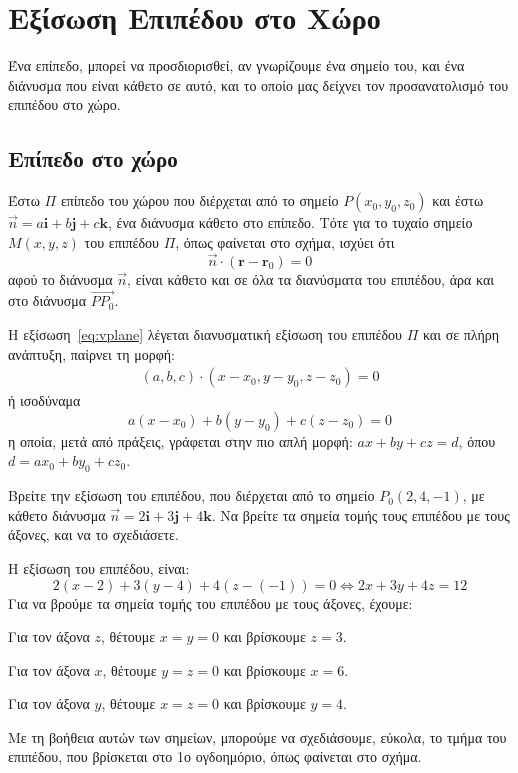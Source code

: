 \chapter*{Εξίσωση Επιπέδου στο Χώρο}

Ένα επίπεδο, μπορεί να προσδιορισθεί, αν γνωρίζουμε ένα σημείο του, και ένα 
διάνυσμα που είναι κάθετο σε αυτό, και το οποίο μας δείχνει τον προσανατολισμό του 
επιπέδου στο χώρο.

\section*{Επίπεδο στο χώρο}

Έστω $ \Pi $ επίπεδο του χώρου που διέρχεται από το σημείο $ P(x_{0}, y_{0}, z_{0}) $ 
και έστω $ \vec{n} = a \mathbf{i} + b \mathbf{j} + c \mathbf{k} $, ένα διάνυσμα κάθετο 
στο επίπεδο. Τότε για το τυχαίο σημείο $ M(x,y,z) $ του επιπέδου $ \Pi $, όπως φαίνεται 
στο σχήμα, ισχύει ότι 
\begin{equation}\label{eq:vplane}
  \vec{n} \cdot (\mathbf{r} - \mathbf{r}_{0}) = 0
\end{equation} 
 αφού το διάνυσμα $ \vec{n} $, είναι κάθετο και σε όλα τα διανύσματα του επιπέδου, άρα 
 και στο διάνυσμα $ \vec{PP_{0}} $. 

 Η εξίσωση~\eqref{eq:vplane} λέγεται \textcolor{Col1}{διανυσματική} εξίσωση του 
 επιπέδου $ \Pi $ και σε πλήρη ανάπτυξη, παίρνει τη μορφή:
 \begin{align*}
   (a,b,c) \cdot (x- x_{0}, y- y_{0}, z- z_{0}) = 0 
 \end{align*} 
 ή ισοδύναμα
 \begin{equation}
   \boxed{a(x- x_{0}) + b(y- y_{0}) + c(z- z_{0}) = 0}
 \end{equation}
 η οποία, μετά από πράξεις, γράφεται στην πιο απλή μορφή:
 $ ax+by+cz=d $, όπου $ d=a x_{0}+ b y_{0}+cz_{0} $.

 \begin{example}
   Βρείτε την εξίσωση του επιπέδου, που διέρχεται από το σημείο $ P_{0}(2,4,-1) $, με 
   κάθετο διάνυσμα $ \vec{n} = 2 \mathbf{i} + 3 \mathbf{j} + 4 \mathbf{k} $. Να βρείτε 
   τα σημεία τομής τους επιπέδου με τους άξονες, και να το σχεδιάσετε.
 \end{example}
 \begin{solution}
   Η εξίσωση του επιπέδου, είναι:
   \[
     2(x-2)+3(y-4)+4(z-(-1)) = 0 \Leftrightarrow 2x+3y+4z=12
   \]
   Για να βρούμε τα σημεία τομής του επιπέδου με τους άξονες, έχουμε:
   \begin{myitemize}
     \item Για τον άξονα $z$, θέτουμε $ x=y=0 $ και βρίσκουμε $ z=3 $.
     \item Για τον άξονα $x$, θέτουμε $ y=z=0 $ και βρίσκουμε $ x=6 $.
     \item Για τον άξονα $y$, θέτουμε $ x=z=0 $ και βρίσκουμε $ y=4 $.
   \end{myitemize}
   Με τη βοήθεια αυτών των σημείων, μπορούμε να σχεδιάσουμε, εύκολα, το τμήμα του 
   επιπέδου, που βρίσκεται στο 1ο ογδοημόριο, όπως φαίνεται στο σχήμα.
 \end{solution}

